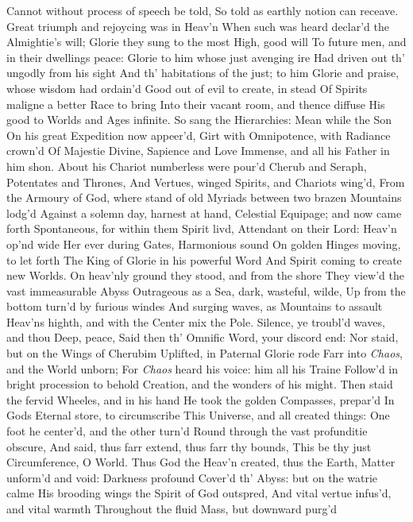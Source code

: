 \documentclass[11pt]{book}
\begin{document}
Cannot without process of speech be told, 
So told as earthly notion can receave. 
Great triumph and rejoycing was in Heav'n 
When such was heard declar'd the Almightie's will; 
Glorie they sung to the most High, good will 
To future men, and in their dwellings peace: 
Glorie to him whose just avenging ire 
Had driven out th' ungodly from his sight 
And th' habitations of the just; to him 
Glorie and praise, whose wisdom had ordain'd 
Good out of evil to create, in stead 
Of Spirits maligne a better Race to bring 
Into their vacant room, and thence diffuse 
His good to Worlds and Ages infinite. 
So sang the Hierarchies: Mean while the Son 
On his great Expedition now appeer'd, 
Girt with Omnipotence, with Radiance crown'd 
Of Majestie Divine, Sapience and Love 
Immense, and all his Father in him shon. 
About his Chariot numberless were pour'd 
Cherub and Seraph, Potentates and Thrones, 
And Vertues, winged Spirits, and Chariots wing'd, 
From the Armoury of God, where stand of old 
Myriads between two brazen Mountains lodg'd 
Against a solemn day, harnest at hand, 
Celestial Equipage; and now came forth 
Spontaneous, for within them Spirit livd, 
Attendant on their Lord: Heav'n op'nd wide 
Her ever during Gates, Harmonious sound 
On golden Hinges moving, to let forth 
The King of Glorie in his powerful Word 
And Spirit coming to create new Worlds. 
On heav'nly ground they stood, and from the shore 
They view'd the vast immeasurable Abyss 
Outrageous as a Sea, dark, wasteful, wilde, 
Up from the bottom turn'd by furious windes 
And surging waves, as Mountains to assault 
Heav'ns highth, and with the Center mix the Pole. 
\quad Silence, ye troubl'd waves, and thou Deep, peace, 
Said then th' Omnific Word, your discord end: 
\quad Nor staid, but on the Wings of Cherubim 
Uplifted, in Paternal Glorie rode 
Farr into \textit{Chaos}, and the World unborn; 
For \textit{Chaos} heard his voice: him all his Traine 
Follow'd in bright procession to behold 
Creation, and the wonders of his might. 
Then staid the fervid Wheeles, and in his hand 
He took the golden Compasses, prepar'd 
In Gods Eternal store, to circumscribe 
This Universe, and all created things: 
One foot he center'd, and the other turn'd 
Round through the vast profunditie obscure, 
And said, thus farr extend, thus farr thy bounds, 
This be thy just Circumference, O World. 
Thus God the Heav'n created, thus the Earth, 
Matter unform'd and void: Darkness profound 
Cover'd th' Abyss: but on the watrie calme 
His brooding wings the Spirit of God outspred, 
And vital vertue infus'd, and vital warmth 
Throughout the fluid Mass, but downward purg'd 
\end{document}
